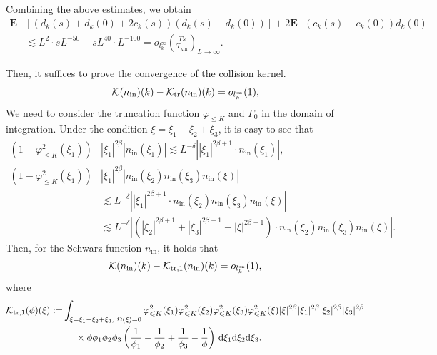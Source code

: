 \documentclass[UTF-8,reqno]{amsart}
\numberwithin{equation}{section}
\theoremstyle{definition}
\def\dif{{\mathord{{\rm d}}}}
\def\leq{\leqslant}
\def\dif{{\mathord{{\rm d}}}}
\def\leq{\leqslant}
\begin{document}
Combining the above estimates, we obtain
\begin{align*}
    \mathbf E&[(d_k(s)+d_k(0)+2c_k(s))(d_k(s)-d_k(0))]+2\mathbf E[(c_k(s)-c_k(0))d_k(0)]\\
    &\lesssim L^2\cdot   sL^{-50}+sL^{40}\cdot L^{-100} =o_{l^\infty_k}\left(\frac{Ts}{T_{\mathrm {kin}}}\right)_{L \to \infty}.
\end{align*}
 

 Then, it suffices to prove the convergence of the collision kernel.\begin{align*} 
   \mathcal K(n_{\mathrm{in}})(k)-\mathcal K_{\rm tr}(n_{\mathrm{in}})(k)
   =o_{l^\infty_k}(1),
\end{align*}
   We need to consider the truncation function $\varphi_{\leq K}$ and  $\Gamma_0$ in the domain of integration. Under the condition $\xi=\xi_1-\xi_2+\xi_3$, it is easy to see that
\begin{align*}
   (1-\varphi_{\leq K}^2(\xi_1)) &|\xi_1|^{2\beta} |n_{\mathrm{in}}(\xi_1) |\lesssim  L^{-\delta}\left||\xi_1|^{2\beta+1}\cdot n_{\mathrm{in}}(\xi_1)\right|,\\
    (1-\varphi_{\leq K}^2(\xi_1)) &|\xi_1|^{2\beta}|n_{\mathrm{in}}(\xi_2)n_{\mathrm{in}}(\xi_3)n_{\mathrm{in}}(\xi) |\\
    &\lesssim L^{-\delta }\left||\xi_1|^{2\beta+1}\cdot n_{\mathrm{in}}(\xi_2)n_{\mathrm{in}}(\xi_3)n_{\mathrm{in}}(\xi)\right|\\
    &\lesssim L^{-\delta }\left|(|\xi_2|^{2\beta+1}+|\xi_3|^{2\beta+1}+|\xi|^{2\beta+1})\cdot n_{\mathrm{in}}(\xi_2)n_{\mathrm{in}}(\xi_3)n_{\mathrm{in}}(\xi)\right|.
\end{align*}
Then, for the Schwarz function $n_{\mathrm{in}}$, it holds that
\begin{align*}
  \mathcal K(n_{\mathrm{in}})(k)-\mathcal K _{\rm tr,1}(n_{\mathrm{in}})(k)=o_{l^\infty_k}(1),
\end{align*}
where 
\begin{align}
    \mathcal K_{\rm tr,1}(\phi)(\xi):=& \int_{\xi=\xi_1-\xi_2+\xi_3,\  {\Omega}(\xi)=0}\varphi_{\leq K}^2(\xi_1)\varphi_{\leq K}^2(\xi_2)\varphi_{\leq K}^2(\xi_3)\varphi_{\leq K}^2(\xi)|\xi|^{2\beta}|\xi_1|^{2\beta}|\xi_2|^{2\beta}|\xi_3|^{2\beta}  \notag\\
   &\ \ \  \  
   \times \phi \phi_1 \phi_2 \phi_3\left(\frac{1}{\phi_1}-\frac{1}{\phi_2}+\frac{1}{\phi_3}-\frac{1}{\phi}\right)\, \dif \xi_1 \dif \xi_2 \dif \xi_3.\notag
\end{align} 
\end{document}

